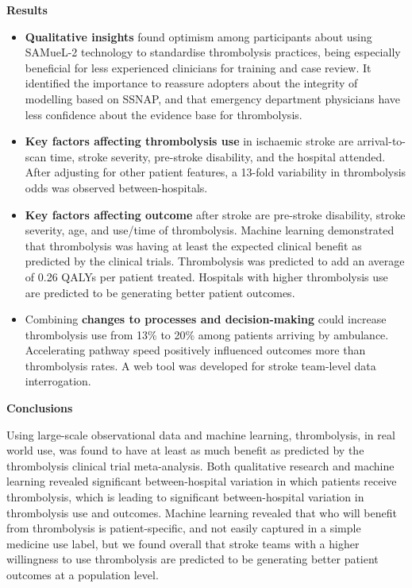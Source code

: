 \documentclass{article}
\begin{document}
\textbf{Results}

\begin{itemize}

    \item \textbf{Qualitative insights} found optimism among participants about using SAMueL-2 technology to standardise thrombolysis practices, being especially beneficial for less experienced clinicians for training and case review. It identified the importance to reassure adopters about the integrity of modelling based on SSNAP, and that emergency department physicians have less confidence about the evidence base for thrombolysis.
    
    \item \textbf{Key factors affecting thrombolysis use} in ischaemic stroke are arrival-to-scan time, stroke severity, pre-stroke disability, and the hospital attended. After adjusting for other patient features, a 13-fold variability in thrombolysis odds was observed between-hospitals.
    
    \item \textbf{Key factors affecting outcome} after stroke are pre-stroke disability, stroke severity, age, and use/time of thrombolysis. Machine learning demonstrated that thrombolysis was having at least the expected clinical benefit as predicted by the clinical trials. Thrombolysis was predicted to add an average of 0.26 QALYs per patient treated. Hospitals with higher thrombolysis use are predicted to be generating better patient outcomes.
    
    \item Combining \textbf{changes to processes and decision-making} could increase thrombolysis use from 13\% to 20\% among patients arriving by ambulance. Accelerating pathway speed positively influenced outcomes more than thrombolysis rates. A web tool was developed for stroke team-level data interrogation.

    \end{itemize}

\textbf{Conclusions}

Using large-scale observational data and machine learning, thrombolysis, in real world use, was found to have at least as much benefit as predicted by the thrombolysis clinical trial meta-analysis. Both qualitative research and machine learning revealed significant between-hospital variation in which patients receive thrombolysis, which is leading to significant between-hospital variation in thrombolysis use and outcomes. Machine learning revealed that who will benefit from thrombolysis is patient-specific, and not easily captured in a simple medicine use label, but we found overall that stroke teams with a higher willingness to use thrombolysis are predicted to be generating better patient outcomes at a population level.





\end{document}

